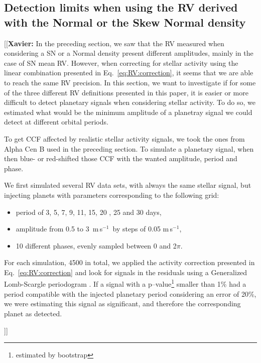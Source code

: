 \documentclass{aa}
\def\ms{\hbox{\,m\,s$^{-1}$}}         %
\newcommand{\xavier}[1]{{\color{blue}[[\textbf{Xavier: }#1]]}}
\begin{document}
\subsection{Detection limits when using the RV derived with the Normal or the Skew Normal density} \label{sec:soap_real}

\xavier{In the preceding section, we saw that the RV measured when considering a SN or a Normal density present different amplitudes, mainly in the case of SN mean RV. However, when correcting for stellar activity using the linear combination presented in Eq.~\ref{eq:RV:correction}, it seems that we are able to reach the same RV precision. In this section, we want to investigate if for some of the three different RV definitions presented in this paper, it is easier or more difficult to detect planetary signals when considering stellar activity. To do so, we estimated what would be the minimum amplitude of a planetray signal we could detect at different orbital periods.

To get CCF affected by realistic stellar activity signals, we took the ones from Alpha Cen B used in the preceding section. To simulate a planetary signal, when then blue- or red-shifted those CCF with the wanted amplitude, period and phase.

We first simulated several RV data sets, with always the same stellar signal, but injecting planets with parameters corresponding to the following grid:
\begin{itemize}
\item period of 3, 5, 7, 9, 11, 15, 20 , 25 and 30 days,
\item amplitude from 0.5 to 3 \ms\, by steps of 0.05\,\ms,
\item 10 different phases, evenly sampled between 0 and 2$\pi$.
\end{itemize}

For each simulation, 4500 in total, we applied the activity correction presented in Eq.~\ref{eq:RV:correction} and look for signals in the residuals using a Generalized Lomb-Scargle periodogram \citep[GLS][]{Zechmeister-2009}. If a signal with a p--value\footnote{estimated by bootstrap} smaller than 1\% had a period compatible with the injected planetary period considering an error of 20\%, we were estimating this signal as significant, and therefore the corresponding planet as detected.

}
\end{document}
